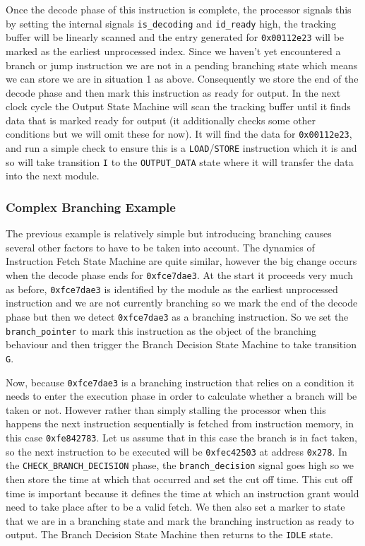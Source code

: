 
Once the decode phase of this instruction is complete, the processor signals this by setting the internal signals \texttt{is\_decoding} and \texttt{id\_ready} high, the tracking buffer will be linearly scanned and the entry generated for \texttt{0x00112e23} will be marked as the earliest unprocessed index. Since we haven't yet encountered a branch or jump instruction we are not in a pending branching state which means we can store we are in situation 1 as above. Consequently we store the end of the decode phase and then mark this instruction as ready for output. In the next clock cycle the Output State Machine will scan the tracking buffer until it finds data that is marked ready for output (it additionally checks some other conditions but we will omit these for now). It will find the data for \texttt{0x00112e23}, and run a simple check to ensure this is a \texttt{LOAD}/\texttt{STORE} instruction which it is and so will take transition \texttt{I} to the \texttt{OUTPUT\_DATA} state where it will transfer the data into the next module.

\subsubsection{Complex Branching Example}

The previous example is relatively simple but introducing branching causes several other factors to have to be taken into account. The dynamics of Instruction Fetch State Machine are quite similar, however the big change occurs when the decode phase ends for \texttt{0xfce7dae3}. At the start it proceeds very much as before, \texttt{0xfce7dae3} is identified by the module as the earliest unprocessed instruction and we are not currently branching so we mark the end of the decode phase but then we detect \texttt{0xfce7dae3} as a branching instruction. So we set the \texttt{branch\_pointer} to mark this instruction as the object of the branching behaviour and then trigger the Branch Decision State Machine to take transition \texttt{G}. 

Now, because \texttt{0xfce7dae3} is a branching instruction that relies on a condition it needs to enter the execution phase in order to calculate whether a branch will be taken or not. However rather than simply stalling the processor when this happens the next instruction sequentially is fetched from instruction memory, in this case \texttt{0xfe842783}. Let us assume that in this case the branch is in fact taken, so the next instruction to be executed will be \texttt{0xfec42503} at address \texttt{0x278}. In the \texttt{CHECK\_BRANCH\_DECISION} phase, the \texttt{branch\_decision} signal goes high so we then store the time at which that occurred and set the cut off time. This cut off time is important because it defines the time at which an instruction grant would need to take place after to be a valid fetch. We then also set a marker to state that we are in a branching state and mark the branching instruction as ready to output. The Branch Decision State Machine then returns to the \texttt{IDLE} state.

